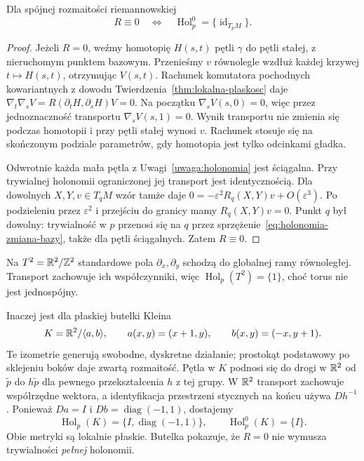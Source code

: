 \begin{stwierdzenie}
\label{prop:holonomia-plaskosc}
Dla spójnej rozmaitości riemannowskiej
\[
 R\equiv0\quad\Longleftrightarrow\quad
 \operatorname{Hol}^0_p=\{\operatorname{id}_{T_pM}\}.
\]
\end{stwierdzenie}
\begin{proof}
Jeżeli $R=0$, weźmy homotopię $H(s,t)$ pętli $\gamma$
do pętli stałej, z nieruchomym punktem bazowym.
Przenieśmy $v$ równolegle wzdłuż każdej krzywej
$t\mapsto H(s,t)$, otrzymując $V(s,t)$.
Rachunek komutatora pochodnych kowariantnych
z dowodu Twierdzenia~\ref{thm:lokalna-plaskosc} daje
$\nabla_t\nabla_sV=R(\partial_tH,\partial_sH)V=0$.
Na początku $\nabla_sV(s,0)=0$, więc przez jednoznaczność
transportu $\nabla_sV(s,1)=0$. Wynik transportu nie
zmienia się podczas homotopii i przy pętli stałej
wynosi $v$. Rachunek stosuje się na skończonym podziale
parametrów, gdy homotopia jest tylko odcinkami gładka.

Odwrotnie każda mała pętla z Uwagi~\ref{uwaga:holonomia}
jest ściągalna. Przy trywialnej holonomii ograniczonej
jej transport jest identycznością. Dla dowolnych
$X,Y,v\in T_qM$ wzór tamże daje
$0=-\varepsilon^2R_q(X,Y)v+O(\varepsilon^3)$.
Po podzieleniu przez $\varepsilon^2$ i przejściu
do granicy mamy $R_q(X,Y)v=0$. Punkt $q$ był dowolny:
trywialność w $p$ przenosi się na $q$ przez
sprzężenie~\eqref{eq:holonomia-zmiana-bazy}, także
dla pętli ściągalnych. Zatem $R\equiv0$.
\end{proof}

\begin{przyklad}
\label{prz:holonomia-torus-klein}
Na $T^2=\mathbb{R}^2/\mathbb{Z}^2$ standardowe pola $\partial_x,\partial_y$
schodzą do globalnej ramy równoległej. Transport zachowuje
ich współczynniki, więc $\operatorname{Hol}_p(T^2)=\{1\}$,
choć torus nie jest jednospójny.

Inaczej jest dla płaskiej butelki Kleina
\[
 K=\mathbb{R}^2/\langle a,b\rangle,
 \qquad a(x,y)=(x+1,y),\qquad b(x,y)=(-x,y+1).
\]
Te izometrie generują swobodne, dyskretne działanie;
prostokąt podstawowy po sklejeniu boków daje zwartą
rozmaitość. Pętla w $K$ podnosi się do drogi w $\mathbb{R}^2$
od $\widetilde p$ do $h\widetilde p$ dla pewnego
przekształcenia $h$ z tej grupy. W $\mathbb{R}^2$ transport
zachowuje współrzędne wektora, a identyfikacja przestrzeni
stycznych na końcu używa $D h^{-1}$. Ponieważ
$Da=I$ i $Db=\operatorname{diag}(-1,1)$, dostajemy
\[
 \operatorname{Hol}_p(K)
   =\{I,\operatorname{diag}(-1,1)\},
 \qquad \operatorname{Hol}^0_p(K)=\{I\}.
\]
Obie metryki są lokalnie płaskie. Butelka pokazuje,
że $R=0$ nie wymusza trywialności \emph{pełnej}
holonomii.
\end{przyklad}

